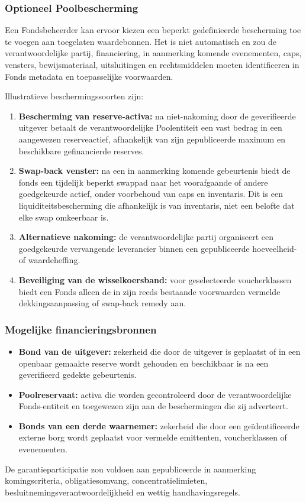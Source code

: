 \documentclass[11pt]{article}
\begin{document}
\subsubsection*{Optioneel Poolbescherming}

Een Fondsbeheerder kan ervoor kiezen een beperkt gedefinieerde bescherming toe te voegen aan toegelaten waardebonnen. Het is niet automatisch en zou de verantwoordelijke partij, financiering, in aanmerking komende evenementen, caps, vensters, bewijsmateriaal, uitsluitingen en rechtsmiddelen moeten identificeren in Fonds metadata en toepasselijke voorwaarden.

Illustratieve beschermingssoorten zijn:

\begin{enumerate}[leftmargin=*]
\item \textbf{Bescherming van reserve-activa:} na niet-nakoming door de geverifieerde uitgever betaalt de verantwoordelijke Poolentiteit een vast bedrag in een aangewezen reserveactief, afhankelijk van zijn gepubliceerde maximum en beschikbare gefinancierde reserves.
\item \textbf{Swap-back venster:} na een in aanmerking komende gebeurtenis biedt de fonds een tijdelijk beperkt swappad naar het voorafgaande of andere goedgekeurde actief, onder voorbehoud van caps en inventaris. Dit is een liquiditeitsbescherming die afhankelijk is van inventaris, niet een belofte dat elke swap omkeerbaar is.
\item \textbf{Alternatieve nakoming:} de verantwoordelijke partij organiseert een goedgekeurde vervangende leverancier binnen een gepubliceerde hoeveelheid- of waardeheffing.
\item \textbf{Beveiliging van de wisselkoersband:} voor geselecteerde voucherklassen biedt een Fonds alleen de in zijn reeds bestaande voorwaarden vermelde dekkingsaanpassing of swap-back remedy aan.
\end{enumerate}
\subsubsection*{Mogelijke financieringsbronnen}

\begin{itemize}[leftmargin=*]
\item \textbf{Bond van de uitgever:} zekerheid die door de uitgever is geplaatst of in een openbaar gemaakte reserve wordt gehouden en beschikbaar is na een geverifieerd gedekte gebeurtenis.
\item \textbf{Poolreservaat:} activa die worden gecontroleerd door de verantwoordelijke Fonds-entiteit en toegewezen zijn aan de beschermingen die zij adverteert.
\item \textbf{Bonds van een derde waarnemer:} zekerheid die door een geïdentificeerde externe borg wordt geplaatst voor vermelde emittenten, voucherklassen of evenementen.
\end{itemize}
De garantieparticipatie zou voldoen aan gepubliceerde in aanmerking komingscriteria, obligatiesomvang, concentratielimieten, besluitnemingsverantwoordelijkheid en wettig handhavingsregels.
\end{document}
